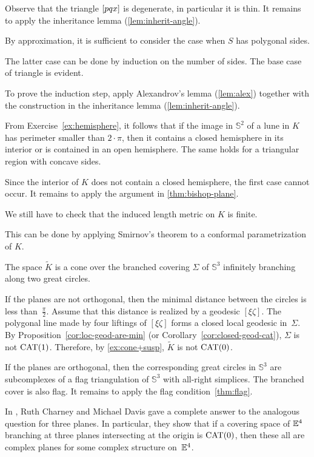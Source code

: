 Observe that the triangle $[pqx]$ is degenerate, in particular it is thin.
It remains to apply the inheritance lemma (\ref{lem:inherit-angle}).

By approximation,
it is sufficient to consider the case when $S$ has polygonal sides.

The latter case can be done by induction on the number of sides.
The base case of triangle is evident.

To prove the induction step, apply Alexandrov's lemma (\ref{lem:alex}) 
together with the construction in the inheritance lemma (\ref{lem:inherit-angle}).


From Exercise~\ref{ex:hemisphere}, it follows that if the image in $\mathbb{S}^2$ of a lune in $K$ has perimeter smaller than $2\cdot\pi$, then it contains a closed hemisphere in its interior
or is contained in an open hemisphere.
The same holds for a triangular region with concave sides.

Since the interior of $K$ does not contain a closed hemisphere, the first case cannot occur.
It remains to apply the argument in \ref{thm:bishop-plane}.

We still have to check that the induced length metric on $K$ is finite.

This can be done by applying Smirnov’s theorem \cite[3.12]{duren} to a conformal parametrization of $K$.

The space $\tilde K$ is a cone over the branched covering $\Sigma$ of $\mathbb{S}^3$ infinitely branching along two great circles.

If the planes are not orthogonal, then the minimal distance between the circles is less than~$\tfrac\pi2$.
Assume that this distance is realized by a geodesic $[\xi\zeta]$.
The polygonal line made by four liftings of $[\xi\zeta]$ forms a closed
local geodesic in~$\Sigma$.
By Proposition~\ref{cor:loc-geod-are-min}
(or Corollary~\ref{cor:closed-geod-cat}),
$\Sigma$ is not $\mathrm{CAT}(1)$.
Therefore, by \ref{ex:cone+susp}, $\tilde K$ is not $\mathrm{CAT}(0)$.

If the planes are orthogonal, then the corresponding great circles in $\mathbb{S}^3$ are subcomplexes of a flag triangulation of $\mathbb{S}^3$ with all-right simplices.
The branched cover is also flag.
It remains to apply the flag condition~\ref{thm:flag}.

In \cite{charney-davis-1993}, Ruth Charney and Michael Davis
gave a complete answer to the analogous question for three planes.
In particular, they show that if a covering space of $\mathbb{E}^4$
branching at three planes intersecting at the origin is $\mathrm{CAT}(0)$, then these all are complex planes for some complex structure on~$\mathbb{E}^4$.


